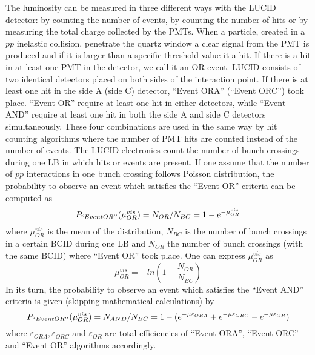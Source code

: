 The luminosity can be measured in three different ways with the LUCID detector: 
by counting the number of events, by counting the number of hits or by measuring the total charge collected by the PMTs. 
When a particle, created in a $pp$ inelastic collision, 
penetrate the quartz window a clear signal from the PMT is produced and if it is larger than a specific threshold value it a hit. 
If there is a hit in at least one PMT in the detector, we call it an OR event. 
LUCID consists of two identical detectors placed on both sides of the interaction point. 
If there is at least one hit in the side A (side C) detector, ``Event ORA'' (``Event ORC'') took place. 
``Event OR'' require at least one hit in either detectors, while ``Event AND'' require at least one hit in both the side A and side C detectors simultaneously. 
These four combinations are used in the same way by hit counting algorithms where the number of PMT hits are counted instead of the number of events.
The LUCID electronics count the number of bunch crossings during one LB in which hits or events are present.
If one assume that the number of $pp$ interactions in one bunch crossing follows Poisson distribution, 
the probability to observe an event which satisfies the ``Event OR'' criteria can be computed as
\begin{equation}
P_{``Event OR''} (\mu_{OR}^{vis}) = N_{OR} / N_{BC} = 1 - e^{-\mu_{OR}^{vis}}
\label{eq:poissonProb}
\end{equation}
where $\mu_{OR}^{vis}$ is the mean of the distribution, $N_{BC}$ is the number of bunch crossings in a certain BCID during one LB and $N_{OR}$ the number of bunch crossings 
(with the same BCID) where ``Event OR'' took place. One can express $\mu_{OR}^{vis}$ as
\begin{equation}
\mu_{OR}^{vis} = -ln( 1 - \dfrac{N_{OR}}{N_{BC}})
\label{eq:logFormula}
\end{equation}
In its turn, the probability to observe an event which satisfies the ``Event AND'' criteria is given (skipping mathematical calculations) by
\begin{equation}
P_{``Event OR''} (\mu_{OR}^{vis}) = N_{AND} / N_{BC} = 1 - ( e^{-\mu \varepsilon_{ORA} } + e^{-\mu \varepsilon_{ORC} } - e^{-\mu \varepsilon_{OR} } )
\label{eq:poissonProb_EventAND}
\end{equation}
where $\varepsilon_{ORA}, \varepsilon_{ORC}$ and $\varepsilon_{OR}$ are total efficiencies of ``Event ORA'', ``Event ORC'' and ``Event OR'' algorithms accordingly.

